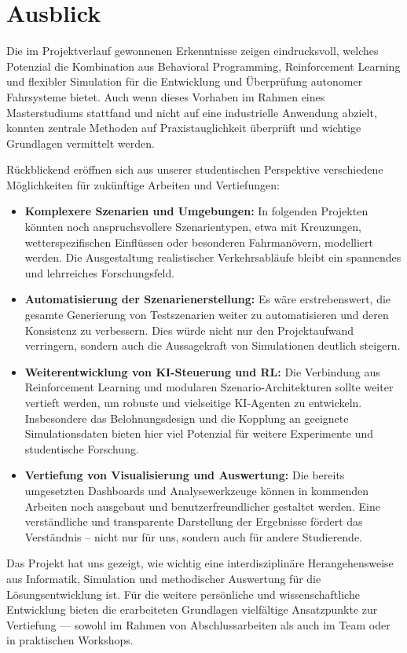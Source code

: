 \chapter{Ausblick}

Die im Projektverlauf gewonnenen Erkenntnisse zeigen eindrucksvoll, welches Potenzial die Kombination aus Behavioral Programming, Reinforcement Learning und flexibler Simulation für die Entwicklung und Überprüfung autonomer Fahrsysteme bietet\cite{EinfuehrungIntegrationsprojekt}. Auch wenn dieses Vorhaben im Rahmen eines Masterstudiums stattfand und nicht auf eine industrielle Anwendung abzielt, konnten zentrale Methoden auf Praxistauglichkeit überprüft und wichtige Grundlagen vermittelt werden.

Rückblickend eröffnen sich aus unserer studentischen Perspektive verschiedene Möglichkeiten für zukünftige Arbeiten und Vertiefungen:
\begin{itemize}
    \item \textbf{Komplexere Szenarien und Umgebungen:} In folgenden Projekten könnten noch anspruchsvollere Szenarientypen, etwa mit Kreuzungen, wetterspezifischen Einflüssen oder besonderen Fahrmanövern, modelliert werden. Die Ausgestaltung realistischer Verkehrsabläufe bleibt ein spannendes und lehrreiches Forschungsfeld.
    \item \textbf{Automatisierung der Szenarienerstellung:} Es wäre erstrebenswert, die gesamte Generierung von Testszenarien weiter zu automatisieren und deren Konsistenz zu verbessern. Dies würde nicht nur den Projektaufwand verringern, sondern auch die Aussagekraft von Simulationen deutlich steigern.
    \item \textbf{Weiterentwicklung von KI-Steuerung und RL:} Die Verbindung aus Reinforcement Learning und modularen Szenario-Architekturen sollte weiter vertieft werden, um robuste und vielseitige KI-Agenten zu entwickeln. Insbesondere das Belohnungsdesign und die Kopplung an geeignete Simulationsdaten bieten hier viel Potenzial für weitere Experimente und studentische Forschung.
    \item \textbf{Vertiefung von Visualisierung und Auswertung:} Die bereits umgesetzten Dashboards und Analysewerkzeuge können in kommenden Arbeiten noch ausgebaut und benutzerfreundlicher gestaltet werden. Eine verständliche und transparente Darstellung der Ergebnisse fördert das Verständnis – nicht nur für uns, sondern auch für andere Studierende.
\end{itemize}

Das Projekt hat uns gezeigt, wie wichtig eine interdisziplinäre Herangehensweise aus Informatik, Simulation und methodischer Auswertung für die Lösungsentwicklung ist. Für die weitere persönliche und wissenschaftliche Entwicklung bieten die erarbeiteten Grundlagen vielfältige Ansatzpunkte zur Vertiefung — sowohl im Rahmen von Abschlussarbeiten als auch im Team oder in praktischen Workshops.
